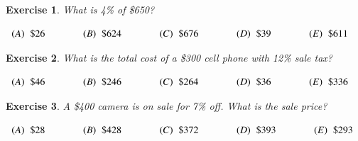 \documentclass[12pt]{amsart}
\newtheorem{exer}{Exercise}
\begin{document}
\begin{exer}
What is 4\% of \$650?

$
\begin{array}{ccccc}
  (A)\hspace{0.2cm} \$26 \hspace{1cm} & (B)\hspace{0.2cm}
   \$624 \hspace{1cm} & (C)\hspace{0.2cm} \$676 \hspace{1cm} &
(D)\hspace{0.2cm} \$39 \hspace{1cm} &
   (E)\hspace{0.2cm} \$611 \\
\end{array}
$
\end{exer}



\begin{exer}
What is the total cost of a \$300 cell phone with 12\% sale tax?

$
\begin{array}{ccccc}
  (A)\hspace{0.2cm} \$46 \hspace{1cm} & (B)\hspace{0.2cm}
   \$246 \hspace{1cm} & (C)\hspace{0.2cm} \$264 \hspace{1cm} &
(D)\hspace{0.2cm} \$36 \hspace{1cm} &
   (E)\hspace{0.2cm} \$336 \\
\end{array}
$
\end{exer}




\begin{exer}
A \$400 camera is on sale for 7\% off. What is the sale price?

$
\begin{array}{ccccc}
  (A)\hspace{0.2cm} \$28 \hspace{1cm} & (B)\hspace{0.2cm}
   \$428 \hspace{1cm} & (C)\hspace{0.2cm} \$372 \hspace{1cm} &
(D)\hspace{0.2cm} \$393 \hspace{1cm} &
   (E)\hspace{0.2cm} \$293 \\
\end{array}
$
\end{exer}
\end{document}
